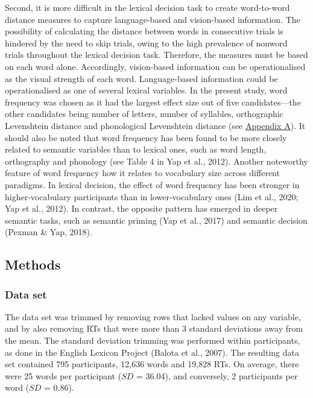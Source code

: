 \documentclass[
  12pt,
  man,floatsintext]{apa7}
\begin{document}
Second, it is more difficult in the lexical decision task to create word-to-word distance measures to capture language-based and vision-based information. The possibility of calculating the distance between words in consecutive trials is hindered by the need to skip trials, owing to the high prevalence of nonword trials throughout the lexical decision task. Therefore, the measures must be based on each word alone. Accordingly, vision-based information can be operationalised as the visual strength of each word. Language-based information could be operationalised as one of several lexical variables. In the present study, word frequency was chosen as it had the largest effect size out of five candidates---the other candidates being number of letters, number of syllables, orthographic Levenshtein distance and phonological Levenshtein distance (see \protect\hyperlink{appendix-A-lexical-covariates}{\underline{Appendix A}}). It should also be noted that word frequency has been found to be more closely related to semantic variables than to lexical ones, such as word length, orthography and phonology (see Table 4 in Yap et al., 2012). Another noteworthy feature of word frequency how it relates to vocabulary size across different paradigms. In lexical decision, the effect of word frequency has been stronger in higher-vocabulary participants than in lower-vocabulary ones (Lim et al., 2020; Yap et al., 2012). In contrast, the opposite pattern has emerged in deeper semantic tasks, such as semantic priming (Yap et al., 2017) and semantic decision (Pexman \& Yap, 2018).

\hypertarget{methods-2}{%
\subsection{Methods}\label{methods-2}}

\hypertarget{data-set-1}{%
\subsubsection{Data set}\label{data-set-1}}

The data set was trimmed by removing rows that lacked values on any variable, and by also removing RTs that were more than 3 standard deviations away from the mean. The standard deviation trimming was performed within participants, as done in the English Lexicon Project (Balota et al., 2007). The resulting data set contained 795 participants, 12,636 words and 19,828 RTs. On average, there were 25 words per participant (\(SD\) = 36.04), and conversely, 2 participants per word (\(SD\) = 0.86).
\end{document}

